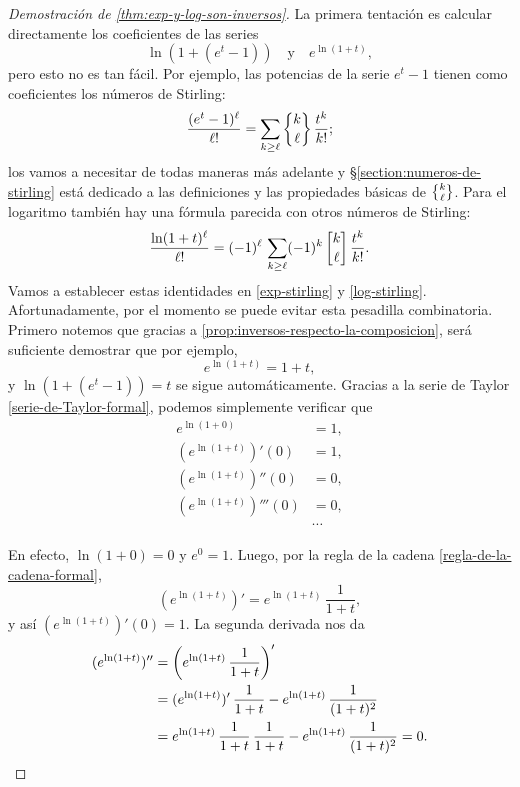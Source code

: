 \documentclass{article}
\numberwithin{equation}{section}
\theoremstyle{definition}
\begin{document}
\begin{proof}[Demostración de \ref{thm:exp-y-log-son-inversos}]
  La primera tentación es calcular directamente los coeficientes de las series
  $$\ln (1 + (e^t - 1)) \quad\text{y}\quad e^{\ln (1 + t)},$$
  pero esto no es tan fácil. Por ejemplo, las potencias de la serie $e^t - 1$
  tienen como coeficientes los números de Stirling:
  $$\frac{(e^t - 1)^\ell}{\ell!} = \sum_{k \ge \ell} \Stirling{k}{\ell}\,\frac{t^k}{k!};$$
  los vamos a necesitar de todas maneras más adelante y
  \S\ref{section:numeros-de-stirling} está dedicado a las definiciones y
  las propiedades básicas de $\Stirling{k}{\ell}$. Para el logaritmo también hay
  una fórmula parecida con otros números de Stirling:
  \[ \frac{\ln (1+t)^\ell}{\ell!} =
    (-1)^\ell \, \sum_{k \ge \ell} (-1)^k\,\stirling{k}{\ell}\,\frac{t^k}{k!}. \]
  Vamos a establecer estas identidades en \ref{exp-stirling} y
  \ref{log-stirling}. Afortunadamente, por el momento se puede evitar esta
  pesadilla combinatoria. Primero notemos que gracias a
  \ref{prop:inversos-respecto-la-composicion}, será suficiente demostrar que por
  ejemplo,
  $$e^{\ln (1+t)} = 1+t,$$
  y $\ln (1 + (e^t - 1)) = t$ se sigue automáticamente. Gracias a la serie de
  Taylor \ref{serie-de-Taylor-formal}, podemos simplemente verificar que
  \begin{align*}
    e^{\ln (1+0)} & = 1,\\
    (e^{\ln (1+t)})' (0) & = 1,\\
    (e^{\ln (1+t)})'' (0) & = 0,\\
    (e^{\ln (1+t)})''' (0) & = 0,\\
                  & \cdots
  \end{align*}

  En efecto, $\ln (1 + 0) = 0$ y $e^0 = 1$. Luego, por la regla de la cadena
  \ref{regla-de-la-cadena-formal},
  $$(e^{\ln (1+t)})' = e^{\ln (1+t)} \, \frac{1}{1+t},$$
  y así $(e^{\ln (1+t)})' (0) = 1$. La segunda derivada nos da
  \begin{align*}
    (e^{\ln (1+t)})'' & = \left(e^{\ln (1+t)} \, \frac{1}{1+t}\right)' \\
                      & = (e^{\ln (1+t)})'\,\frac{1}{1+t} - e^{\ln (1+t)}\,\frac{1}{(1+t)^2} \\
                      & = e^{\ln (1+t)} \, \frac{1}{1+t}\, \frac{1}{1+t} - e^{\ln (1+t)}\,\frac{1}{(1+t)^2} = 0.
                        \qedhere
  \end{align*}
\end{proof}
\end{document}
